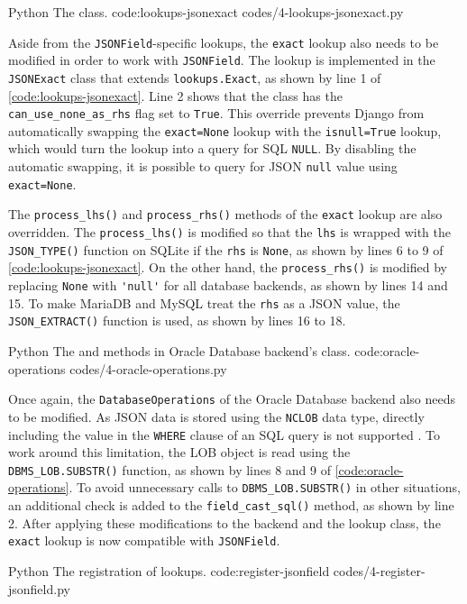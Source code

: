 \listing
{Python}
{The  class.}
{code:lookups-jsonexact}
{codes/4-lookups-jsonexact.py}

Aside from the \verb|JSONField|-specific lookups, the \verb|exact| lookup also
needs to be modified in order to work with \verb|JSONField|. The lookup is
implemented in the \verb|JSONExact| class that extends \verb|lookups.Exact|, as
shown by line 1 of \autoref{code:lookups-jsonexact}. Line 2 shows that the
class has the \verb|can_use_none_as_rhs| flag set to \verb|True|. This override
prevents Django from automatically swapping the \verb|exact=None| lookup with
the \verb|isnull=True| lookup, which would turn the lookup into a query for SQL
\verb|NULL|. By disabling the automatic swapping, it is possible to query for
JSON \verb|null| value using \verb|exact=None|.

The \verb|process_lhs()| and \verb|process_rhs()| methods of the \verb|exact|
lookup are also overridden. The \verb|process_lhs()| is modified so that the
\verb|lhs| is wrapped with the \verb|JSON_TYPE()| function on SQLite if the
\verb|rhs| is \verb|None|, as shown by lines 6 to 9 of
\autoref{code:lookups-jsonexact}. On the other hand, the \verb|process_rhs()|
is modified by replacing \verb|None| with \verb|'null'| for all database
backends, as shown by lines 14 and 15. To make MariaDB and MySQL treat the
\verb|rhs| as a JSON value, the \verb|JSON_EXTRACT()| function is used, as
shown by lines 16 to 18.

\listing
{Python}
{The  and  methods in Oracle
Database backend's  class.}
{code:oracle-operations}
{codes/4-oracle-operations.py}

Once again, the \verb|DatabaseOperations| of the Oracle Database backend also
needs to be modified. As JSON data is stored using the \verb|NCLOB| data type,
directly including the value in the \verb|WHERE| clause of an SQL query is not
supported \cite{oracle:comparison}. To work around this limitation, the LOB
object is read using the \verb|DBMS_LOB.SUBSTR()| function, as shown by lines 8
and 9 of \autoref{code:oracle-operations}. To avoid unnecessary calls to
\verb|DBMS_LOB.SUBSTR()| in other situations, an additional check is added to
the \verb|field_cast_sql()| method, as shown by line 2. After applying these
modifications to the backend and the lookup class, the \verb|exact| lookup is
now compatible with \verb|JSONField|.

\listing
{Python}
{The registration of  lookups.}
{code:register-jsonfield}
{codes/4-register-jsonfield.py}


